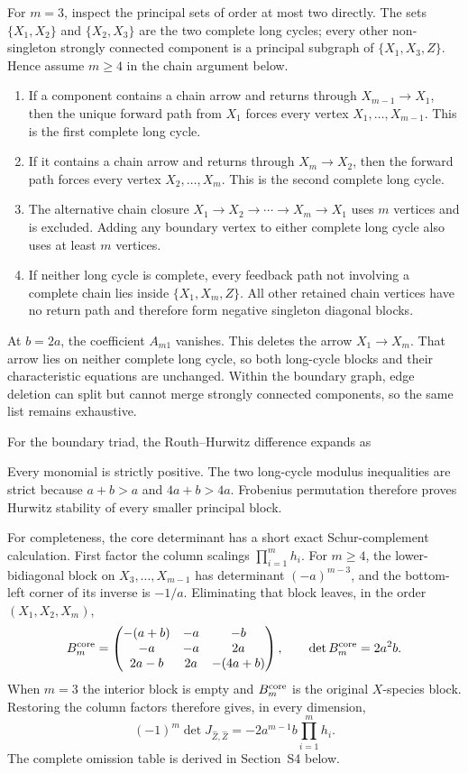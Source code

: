 \documentclass[10pt]{article}
\newcommand{\1}{\mathbf1}
\begin{document}
For $m=3$, inspect the principal sets of order at most two directly.  The sets
$\{X_1,X_2\}$ and $\{X_2,X_3\}$ are the two complete long cycles; every
other non-singleton strongly connected component is a principal subgraph of
$\{X_1,X_3,Z\}$.  Hence assume $m\ge4$ in the chain argument below.

\begin{enumerate}[leftmargin=2em]
\item If a component contains a chain arrow and returns through
$X_{m-1}\to X_1$, then the unique forward path from $X_1$ forces every vertex
$X_1,\ldots,X_{m-1}$.  This is the first complete long cycle.
\item If it contains a chain arrow and returns through $X_m\to X_2$, then the
forward path forces every vertex $X_2,\ldots,X_m$.  This is the second complete
long cycle.
\item The alternative chain closure
$X_1\to X_2\to\cdots\to X_m\to X_1$ uses $m$ vertices and is excluded.
Adding any boundary vertex to either complete long cycle also uses at least
$m$ vertices.
\item If neither long cycle is complete, every feedback path not involving a
complete chain lies inside $\{X_1,X_m,Z\}$.  All other retained chain vertices
have no return path and therefore form negative singleton diagonal blocks.
\end{enumerate}
At $b=2a$, the coefficient $A_{m1}$ vanishes.  This deletes the arrow
$X_1\to X_m$.  That arrow lies on neither complete long cycle, so both
long-cycle blocks and their characteristic equations are unchanged.  Within
the boundary graph, edge deletion can split but cannot merge strongly
connected components, so the same list remains exhaustive.

For the boundary triad, the Routh--Hurwitz difference expands as

Every monomial is strictly positive.  The two long-cycle modulus inequalities
are strict because $a+b>a$ and $4a+b>4a$.  Frobenius permutation therefore
proves Hurwitz stability of every smaller principal block.

For completeness, the core determinant has a short exact Schur-complement
calculation.  First factor the column scalings $\prod_{i=1}^m h_i$.  For
$m\ge4$, the lower-bidiagonal block on
$X_3,\ldots,X_{m-1}$ has determinant $(-a)^{m-3}$, and the bottom-left corner
of its inverse is $-1/a$.  Eliminating that block leaves, in the order
$(X_1,X_2,X_m)$,
\[
 B_m^{\rm core}=\begin{pmatrix}
 -(a+b)&-a&-b\\
 -a&-a&2a\\
 2a-b&2a&-(4a+b)
 \end{pmatrix},
 \qquad \det B_m^{\rm core}=2a^2b.
\]
When $m=3$ the interior block is empty and $B_m^{\rm core}$ is the original $X$-species
block.  Restoring the column factors therefore gives, in every dimension,
\[
 (-1)^m\det J_{\widehat Z,\widehat Z}
 =-2a^{m-1}b\prod_{i=1}^m h_i.
\]
The complete omission table is derived in Section~S4 below.
\end{document}
